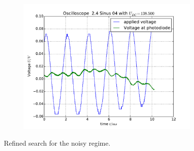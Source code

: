 \begin{figure}
\begin{subfigure}[b]{\picwidth}
        \caption{}
    \end{subfigure}
    \begin{subfigure}[b]{\picwidth}
        \includegraphics[width=\textwidth]{analysis/figures/24sinus04}
        \caption{}
    \end{subfigure}
    \caption{Refined search for the noisy regime.}
    \label{fig:sinus7}
\end{figure}

